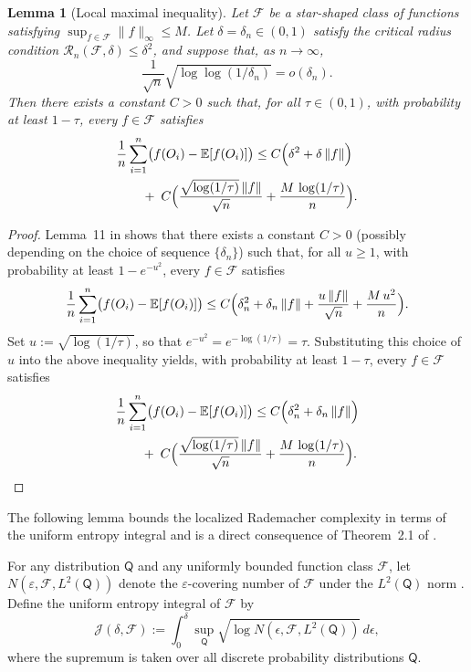 \documentclass{article}
\theoremstyle{plain}
\newtheorem{lemma}{Lemma}
\theoremstyle{definition}
\theoremstyle{remark}
\begin{document}
\begin{lemma}[Local maximal inequality]\label{lemma:loc_max_ineq}
Let $\mathcal{F}$ be a star-shaped class of functions satisfying
$\sup_{f\in\mathcal{F}} \|f\|_{\infty} \le M$.
Let $\delta = \delta_n \in (0,1)$ satisfy the critical radius condition
$\mathcal{R}_n(\mathcal{F},\delta) \le \delta^2$,
and suppose that, as $n\to\infty$,
\[
\frac{1}{\sqrt{n}}\sqrt{\log\log(1/\delta_n)} = o(\delta_n).
\]
Then there exists a constant $C>0$ such that, for all $\tau \in (0,1)$,
with probability at least $1 - \tau$, every $f \in \mathcal{F}$ satisfies
\begin{align*}
&\frac{1}{n}\sum_{i=1}^n
\bigl(f(O_i) - \mathbb{E}[f(O_i)]\bigr)
\le
C\Bigl(
    \delta^2
    + \delta\,\|f\|
\Bigr)
\\
&\qquad+\;
C\Bigl(
    \frac{\sqrt{\log(1/\tau)}\,\|f\|}{\sqrt{n}}
    + \frac{M\,\log(1/\tau)}{n}
\Bigr).
\end{align*}
\end{lemma}
\begin{proof}
Lemma~11 in \cite{van2025nonparametric} shows that there exists a
constant $C>0$ (possibly depending on the choice of sequence $\{\delta_n\}$) such that, for all $u \ge 1$, with probability at least
$1 - e^{-u^2}$, every $f \in \mathcal{F}$ satisfies
\[
\frac{1}{n}\sum_{i=1}^n
\bigl(f(O_i) - \mathbb{E}[f(O_i)]\bigr)
\le
C\Bigl(
  \delta_n^2
  + \delta_n\,\|f\|
  + \frac{u\,\|f\|}{\sqrt{n}}
  + \frac{M\,u^2}{n}
\Bigr).
\]
Set $u := \sqrt{\log(1/\tau)}$,
so that
$
e^{-u^2}
= e^{-\log(1/\tau)}
= \tau.
$
Substituting this choice of $u$ into the above inequality yields, with
probability at least $1 - \tau$, every $f \in \mathcal{F}$ satisfies
\begin{align*}
&\frac{1}{n}\sum_{i=1}^n
\bigl(f(O_i) - \mathbb{E}[f(O_i)]\bigr)
\le
C\Bigl(
    \delta_n^2
    + \delta_n\,\|f\|
\Bigr)
\\
&\qquad+\;
C\Bigl(
    \frac{\sqrt{\log(1/\tau)}\,\|f\|}{\sqrt{n}}
    + \frac{M\,\log(1/\tau)}{n}
\Bigr).
\end{align*}



 
\end{proof}



The following lemma bounds the localized Rademacher complexity in terms of the uniform entropy integral and is a direct consequence of Theorem~2.1 of \citet{van2011local}.

For any distribution \(\mathsf Q\) and any uniformly bounded function class \(\mathcal{F}\), let  
\(N(\varepsilon, \mathcal{F}, L^2(\mathsf Q))\) denote the \(\varepsilon\)-covering number of \(\mathcal{F}\) under the \(L^2(\mathsf Q)\) norm \citep{van1996weak}.  
Define the uniform entropy integral of \(\mathcal{F}\) by
\begin{equation*}
\mathcal{J}(\delta, \mathcal{F})
:=
\int_{0}^{\delta}
\sup_{\mathsf Q}
\sqrt{\log N(\epsilon, \mathcal{F}, L^2(\mathsf Q))}\, d\epsilon ,
\end{equation*}
where the supremum is taken over all discrete probability distributions \(\mathsf Q\).
\end{document}

